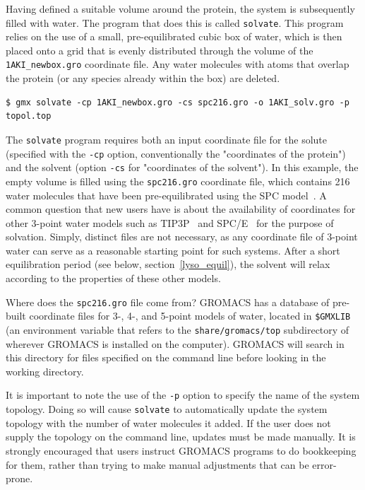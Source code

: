 \documentclass[9pt,tutorial,pubversion]{livecoms}
\begin{document}
Having defined a suitable volume around the protein, the system is subsequently filled with water. The program that does this is called \texttt{solvate}. This program relies on the use of a small, pre-equilibrated cubic box of water, which is then placed onto a grid that is evenly distributed through the volume of the \texttt{1AKI\_newbox.gro} coordinate file. Any water molecules with atoms that overlap the protein (or any species already within the box) are deleted.

\begin{lstlisting}
$ gmx solvate -cp 1AKI_newbox.gro -cs spc216.gro -o 1AKI_solv.gro -p topol.top
\end{lstlisting}
%
The \texttt{solvate} program requires both an input coordinate file for the solute (specified with the \texttt{-cp} option, conventionally the "coordinates of the protein") and the solvent (option \texttt{-cs} for "coordinates of the solvent"). In this example, the empty volume is filled using the \texttt{spc216.gro} coordinate file, which contains 216 water molecules that have been pre-equilibrated using the SPC model~\cite{Berendsen1981}. A common question that new users have is about the availability of coordinates for other 3-point water models such as TIP3P~\cite{Jorgensen1983} and SPC/E~\cite{Berendsen1987} for the purpose of solvation. Simply, distinct files are not necessary, as any coordinate file of 3-point water can serve as a reasonable starting point for such systems. After a short equilibration period (see below, section~\ref{lyso_equil}), the solvent will relax according to the properties of these other models.

Where does the \texttt{spc216.gro} file come from? GROMACS has a database of pre-built coordinate files for 3-, 4-, and 5-point models of water, located in \texttt{\$GMXLIB} (an environment variable that refers to the \texttt{share/gromacs/top} subdirectory of wherever GROMACS is installed on the computer). GROMACS will search in this directory for files specified on the command line before looking in the working directory.

It is important to note the use of the \texttt{-p} option to specify the name of the system topology. Doing so will cause \texttt{solvate} to automatically update the system topology with the number of water molecules it added. If the user does not supply the topology on the command line, updates must be made manually. It is strongly encouraged that users instruct GROMACS programs to do bookkeeping for them, rather than trying to make manual adjustments that can be error-prone.
\end{document}
